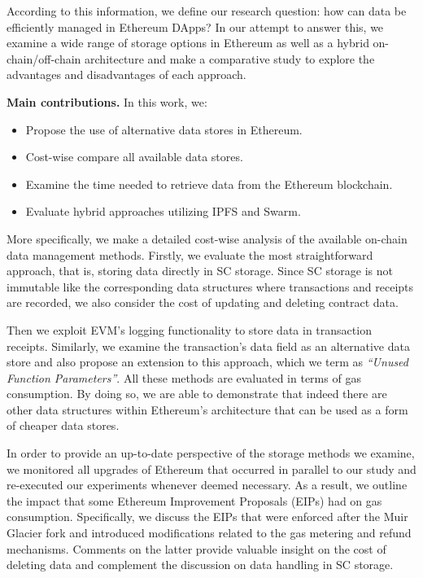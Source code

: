 According to this information, we define our research question: how can data be efficiently managed in Ethereum DApps?
In our attempt to answer this, we examine a wide range of storage options in Ethereum as well as a hybrid on-chain/off-chain architecture and make a comparative study to explore the advantages and disadvantages of each approach. 

\vspace{8pt}
{\bf Main contributions.} In this work, we:
\begin{itemize}[itemsep=0pt]
\item{Propose the use of alternative data stores in Ethereum.}
\item{Cost-wise compare all available data stores.}
\item{Examine the time needed to retrieve data from the Ethereum blockchain.}
\item{Evaluate hybrid approaches utilizing IPFS and Swarm.}
\end{itemize}

More specifically, we make a detailed cost-wise analysis of the available on-chain data management methods. Firstly, we evaluate the most straightforward approach, that is, storing data directly in SC storage. Since SC storage is not immutable like the corresponding data structures where transactions and receipts are recorded, we also consider the cost of updating and deleting contract data. 

Then we exploit EVM’s logging functionality to store data in transaction receipts. Similarly, we examine the transaction's data field as an alternative data store and also propose an extension to this approach, which we term as \emph{``Unused Function Parameters''}. All these methods are evaluated in terms of gas consumption. By doing so, we are able to demonstrate that indeed there are other data structures within Ethereum’s architecture that can be used as a form of cheaper data stores.


In order to provide an up-to-date perspective of the storage methods we examine, we monitored all upgrades of Ethereum that occurred in parallel to our study and re-executed our experiments whenever deemed necessary. As a result, we outline the impact that some Ethereum Improvement Proposals (EIPs) had on gas consumption. Specifically, we discuss the EIPs that were enforced after the Muir Glacier fork and introduced modifications related to the gas metering and refund mechanisms. Comments on the latter provide valuable insight on the cost of deleting data and complement the discussion on data handling in SC storage.


